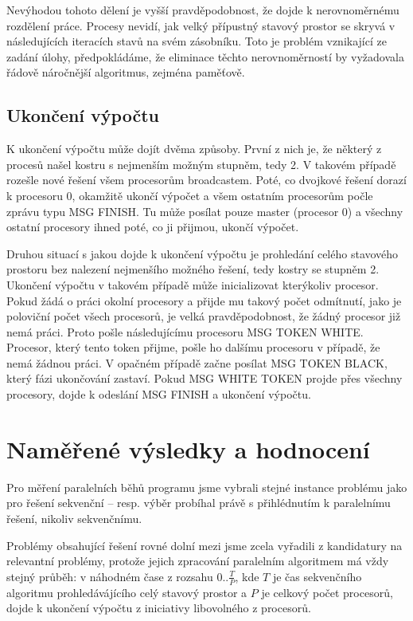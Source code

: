 \documentclass[]{article}
\begin{document}
Nevýhodou tohoto dělení je vyšší pravděpodobnost, že dojde k nerovnoměrnému rozdělení práce. Procesy nevidí, jak velký přípustný stavový prostor se skryvá v následujících iteracích stavů na svém zásobníku. Toto je problém vznikající ze zadání úlohy, předpokládáme, že eliminace těchto nerovnoměrností by vyžadovala řádově náročnější algoritmus, zejména paměťově.


\subsection{Ukončení výpočtu}

K ukončení výpočtu může dojít dvěma způsoby. První z nich je, že některý z procesů našel kostru s nejmenším možným stupněm, tedy 2. V takovém případě rozešle nové řešení všem procesorům broadcastem. Poté, co dvojkové řešení dorazí k procesoru 0, okamžitě ukončí výpočet a všem ostatním procesorům počle zprávu typu MSG FINISH. Tu může posílat pouze master (procesor 0) a všechny ostatní procesory ihned poté, co ji přijmou, ukončí výpočet.

Druhou situací s jakou dojde k ukončení výpočtu je prohledání celého stavového prostoru bez nalezení nejmenšího možného řešení, tedy kostry se stupněm 2. Ukončení výpočtu v takovém případě může inicializovat kterýkoliv procesor. Pokud žádá o práci okolní procesory a přijde mu takový počet odmítnutí, jako je poloviční počet všech procesorů, je velká pravděpodobnost, že žádný procesor již nemá práci. Proto pošle následujícímu procesoru MSG TOKEN WHITE. Procesor, který tento token přijme, pošle ho dalšímu procesoru v případě, že nemá žádnou práci. V opačném případě začne posílat MSG TOKEN BLACK, který fázi ukončování zastaví. Pokud MSG WHITE TOKEN projde přes všechny procesory, dojde k odeslání MSG FINISH a ukončení výpočtu.



\section{Naměřené výsledky a hodnocení}

Pro měření paralelních běhů programu jsme vybrali stejné instance problému jako pro řešení sekvenční -- resp. výběr probíhal právě s přihlédnutím k paralelnímu řešení, nikoliv sekvenčnímu.

Problémy obsahující řešení rovné dolní mezi jsme zcela vyřadili z kandidatury na relevantní problémy, protože jejich zpracování paralelním algoritmem má vždy stejný průběh: v náhodném čase z rozsahu \(0..\frac{T}{P}\), kde \(T\) je čas sekvenčního algoritmu prohledávájícího celý stavový prostor a \(P\) je celkový počet procesorů, dojde k ukončení výpočtu z iniciativy libovolného z procesorů.
\end{document}

